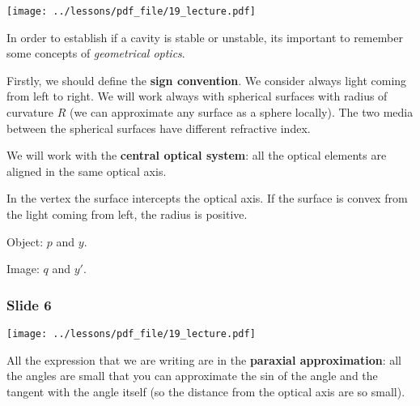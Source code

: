 \documentclass[../main/main.tex]{subfiles}
\begin{document}
\begin{minipage}[]{0.5\linewidth}
\centering
\texttt{[image: ../lessons/pdf\_file/19\_lecture.pdf]}
\end{minipage}
\hspace{0.3cm}\vspace{0.3cm}
\begin{minipage}[c]{0.47\linewidth}

In order to establish if a cavity is stable or unstable, its important to remember some concepts of \emph{geometrical optics}.

Firstly, we should define the \textbf{sign convention}.  We consider always light coming from left to right. We will work always with spherical surfaces with radius of curvature \( R \) (we can approximate any surface as a sphere locally).
The two media between the spherical surfaces have different refractive index.

We will work with the \textbf{central optical system}: all the optical elements are aligned in the same optical axis.

In the vertex the surface intercepts the optical axis. If the surface is convex from the light coming from left, the radius is positive.

Object: \( p \) and \( y \).

Image: \( q \) and \( y' \).


\end{minipage}

\subsubsection*{Slide 6}

\begin{minipage}[]{0.5\linewidth}
\centering
\texttt{[image: ../lessons/pdf\_file/19\_lecture.pdf]}
\end{minipage}
\hspace{0.3cm}\vspace{0.3cm}
\begin{minipage}[c]{0.47\linewidth}

All the expression that we are writing are in the \textbf{paraxial approximation}: all the angles are small that you can approximate the sin of the angle and the tangent with the angle itself (so the distance from the optical axis are so small).

\end{minipage}
\end{document}
